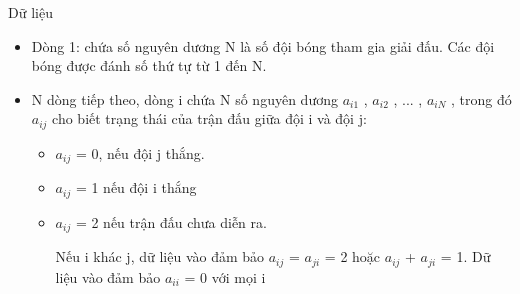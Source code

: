Dữ liệu  
\begin{itemize}
	\item     Dòng 1: chứa số nguyên dương N là số đội bóng tham gia giải đấu. Các đội bóng được đánh số thứ tự từ 1 đến N.   
	\item     N dòng tiếp theo, dòng i chứa N số nguyên dương $a_{i1}$    , $a_{i2}$    , ... , $a_{iN}$    , trong đó $a_{ij}$    cho biết trạng thái của trận đấu giữa đội i và đội j:    
\begin{itemize}
	\item       $a_{ij}$      = 0, nếu đội j thắng.     
	\item       $a_{ij}$      = 1 nếu đội i thắng     
	\item       $a_{ij}$      = 2 nếu trận đấu chưa diễn ra.      

       Nếu i khác j, dữ liệu vào đảm bảo $a_{ij}$       = $a_{ji}$       = 2 hoặc $a_{ij}$       + $a_{ji}$       = 1. Dữ liệu vào đảm bảo $a_{ii}$       = 0 với mọi i      
\end{itemize}
\end{itemize}